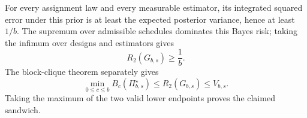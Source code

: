 For every assignment law and every measurable estimator, its integrated squared error under this prior is at least the expected posterior variance, hence at least \(1/b\).  The supremum over admissible schedules dominates this Bayes risk; taking the infimum over designs and estimators gives
\[
R_2(G_{b,s})\geq\frac1b.
\]
The block-clique theorem separately gives
\[
\min_{0\leq c\leq b}B_c(\Pi_{b,s}^{\star})\leq R_2(G_{b,s})\leq V_{b,s}.
\]
Taking the maximum of the two valid lower endpoints proves the claimed sandwich.